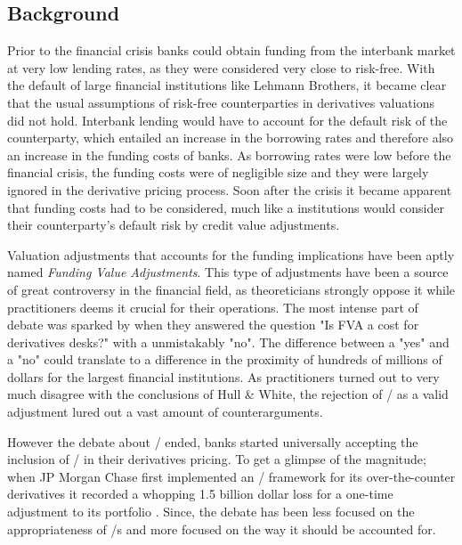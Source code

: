 \documentclass[main.tex]{subfiles}
\begin{document}
    \subsection{Background}
        
    Prior to the financial crisis banks could obtain funding from the interbank market
    at very low lending rates, as they were considered very close to risk-free.
    With the default of large financial institutions like Lehmann Brothers, 
    it became clear that the usual assumptions of risk-free counterparties 
    in derivatives valuations did not hold.
    Interbank lending would have to account for the default risk of the counterparty,
    which entailed an increase in the borrowing rates 
    and therefore also an increase in the funding costs of banks.
    As borrowing rates were low before the financial crisis, 
    the funding costs were of negligible size 
    and they were largely ignored in the derivative pricing process.
    Soon after the crisis it became apparent that funding costs had to be considered,
    much like a institutions would consider their counterparty's default risk by 
    credit value adjustments.

    Valuation adjustments that accounts for the funding implications 
    have been aptly named \textit{Funding Value Adjustments}.
    This type of adjustments have been a source of great controversy in the financial field,
    as theoreticians strongly oppose it while practitioners deems it crucial for their operations.
    The most intense part of debate was sparked by \textcite{HullWhite2012FVA}
    when they answered the question "Is FVA a cost for derivatives desks?" 
    with a unmistakably "no".
    The difference between a "yes" and a "no" could translate to a difference 
    in the proximity of hundreds of millions of dollars for the largest financial institutions.
    As practitioners turned out to very much disagree with the conclusions of Hull \& White,
    the rejection of \FVA/ as a valid adjustment lured out a vast amount of counterarguments.

    However the debate about \FVA/ ended, banks started universally accepting the inclusion of \FVA/
    in their derivatives pricing.
    To get a glimpse of the magnitude; when JP Morgan Chase first implemented an \FVA/ framework
    for its over-the-counter derivatives it recorded a whopping 1.5 billion dollar loss
    for a one-time adjustment to its portfolio \textcite{JPMorganEarnings}.
    Since, the debate has been less focused on the appropriateness of \FVA/s
    and more focused on the way it should be accounted for.
\end{document}
